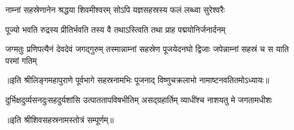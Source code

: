 \twolineshloka
{नाम्नां सहस्रेणानेन श्रद्धया शिवमीश्वरम्}
{सोऽपि यज्ञसहस्रस्य फलं लब्ध्वा सुरेश्वरैः}%

\twolineshloka
{पूज्यो भवति रुद्रस्य प्रीतिर्भवति तस्य वै}
{तथाऽस्त्विति तथा प्राह पद्मयोनिर्जनार्दनम्}%

\threelineshloka
{जग्मतुः प्रणिपत्यैनं देवदेवं जगद्गुरुम्}
{तस्मान्नाम्नां सहस्रेण पूजयेदनघो द्विजाः}
{जपेन्नाम्नां सहस्रं च स याति परमां गतिम्}%

{॥इति श्रीलिङ्गमहापुराणे पूर्वभागे सहस्रनामभिः पूजनाद् विष्णुचक्रलाभो नामाष्टनवतितमोऽध्यायः॥}%

{दुर्भिक्षदुर्व्यसनदुःसहदुर्यशांसि}
{उत्पाततापविषभीतिम् असद्‌ग्रहार्तिम्}
{व्याधींश्च नाशयतु मे जगतामधीशः}

॥इति श्रीशिवसहस्रनामस्तोत्रं सम्पूर्णम्॥

\hyperref[sec:start_ShivaSahasranamaStotram-VishnuKrtam]{\closesection}